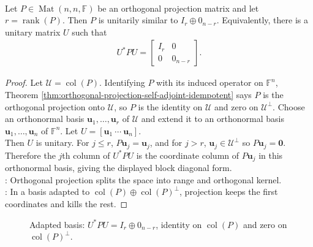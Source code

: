 \begin{theorem} \label{thm:orthogonal-projection-matrix-unitary-coordinate-form} \\
Let $P\in\operatorname{Mat}(n,n,\mathbb{F})$ be an orthogonal projection matrix and let $r=\operatorname{rank}(P)$. Then $P$ is unitarily similar to $I_r\oplus0_{n-r}$. Equivalently, there is a unitary matrix $U$ such that
\begin{align}
U^*PU=
\begin{bmatrix}
I_r & 0\\
0 & 0_{n-r}
\end{bmatrix}. \nonumber
\end{align}
\begin{proof}
Let $\mathcal{U}=\operatorname{col}(P)$. Identifying $P$ with its induced operator on $\mathbb{F}^n$, Theorem \ref{thm:orthogonal-projection-self-adjoint-idempotent} says $P$ is the orthogonal projection onto $\mathcal{U}$, so $P$ is the identity on $\mathcal{U}$ and zero on $\mathcal{U}^{\perp}$. Choose an orthonormal basis $\mathbf{u}_1,\ldots,\mathbf{u}_r$ of $\mathcal{U}$ and extend it to an orthonormal basis $\mathbf{u}_1,\ldots,\mathbf{u}_n$ of $\mathbb{F}^n$. Let $U=[\mathbf{u}_1\ \cdots\ \mathbf{u}_n]$.\\
Then $U$ is unitary. For $j\leq r$, $P\mathbf{u}_j=\mathbf{u}_j$, and for $j>r$, $\mathbf{u}_j\in\mathcal{U}^{\perp}$ so $P\mathbf{u}_j=\mathbf{0}$. Therefore the $j$th column of $U^*PU$ is the coordinate column of $P\mathbf{u}_j$ in this orthonormal basis, giving the displayed block diagonal form.\\
: Orthogonal projection splits the space into range and orthogonal kernel.\\
: In a basis adapted to $\operatorname{col}(P)\oplus\operatorname{col}(P)^{\perp}$, projection keeps the first coordinates and kills the rest.
\end{proof}
\end{theorem}

\begin{figure}[H]
  \centering
  
  \caption{Adapted basis: $U^*PU=I_r\oplus0_{n-r}$, identity on $\operatorname{col}(P)$ and zero on $\operatorname{col}(P)^\perp$.}
  \label{fig:orthogonal-projection-unitary-block}
\end{figure}

